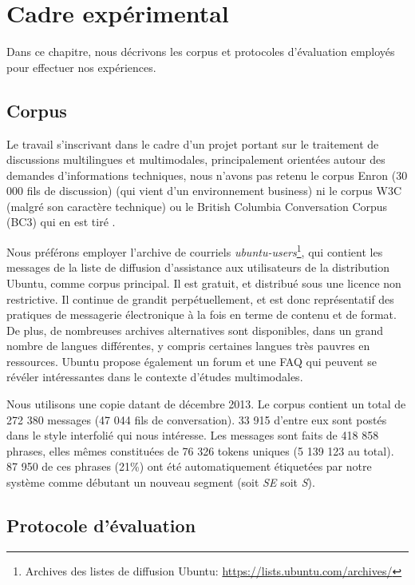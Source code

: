 
\chapter{Cadre expérimental}

\label{ch:experimental_framework}

Dans ce chapitre, nous décrivons les corpus et protocoles d'évaluation employés pour effectuer nos expériences.

\section{Corpus}

Le travail s'inscrivant dans le cadre d'un projet portant sur le traitement de discussions multilingues et multimodales, principalement orientées autour des demandes d'informations techniques, nous n'avons pas retenu le corpus Enron (30 000 fils de discussion) \cite{klimt:2004:enron} (qui vient d'un environnement business) ni le corpus W3C (malgré son caractère technique) ou le British Columbia Conversation Corpus (BC3) qui en est tiré \cite{ulrich:2008:bc3}.

Nous préférons employer l'archive de courriels \textit{ubuntu-users}\footnote{Archives des listes de diffusion Ubuntu: \url{https://lists.ubuntu.com/archives/}}, qui contient les messages de la liste de diffusion d'assistance aux utilisateurs de la distribution Ubuntu, comme corpus principal. Il est gratuit, et distribué sous une licence non restrictive. Il continue de grandit perpétuellement, et est donc représentatif des pratiques de messagerie électronique à la fois en terme de contenu et de format. De plus, de nombreuses archives alternatives sont disponibles, dans un grand nombre de langues différentes, y compris certaines langues très pauvres en ressources. Ubuntu propose également un forum et une FAQ qui peuvent se révéler intéressantes dans le contexte d'études multimodales.

Nous utilisons une copie datant de décembre 2013. Le corpus contient un total de 272 380 messages (47 044 fils de conversation). 33 915 d'entre eux sont postés dans le style interfolié qui nous intéresse. Les messages sont faits de 418 858 phrases, elles mêmes constituées de 76 326 tokens uniques (5 139 123 au total). 87 950 de ces phrases (21\%) ont été automatiquement étiquetées par notre système comme débutant un nouveau segment (soit \textit{SE} soit \textit{S}).

\section{Protocole d'évaluation}


